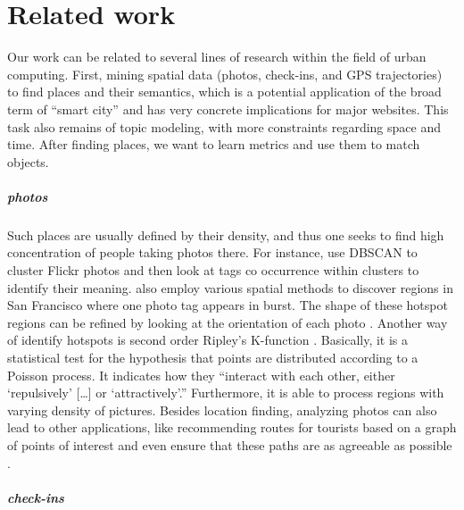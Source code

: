 \chapter{Related work}
\label{chap:related}

Our work can be related to several lines of research within the field of urban
computing. First, mining spatial data (photos, check-ins, and GPS
trajectories) to find places and their semantics, which is a potential
application of the broad term of \enquote{smart city} and has very concrete
implications for major websites. This task also remains of topic modeling,
with more constraints regarding space and time. After finding places, we want
to learn metrics and use them to match objects.

\paragraph{photos}

Such places are usually defined by their density, and thus one seeks to find
high concentration of people taking photos there. For instance,
\textcite{Deng2009} use \textsc{DBSCAN} to cluster Flickr photos and then look
at tags co occurrence within clusters to identify their meaning.
\Textcite{Rattenbury2009} also employ various spatial methods to discover
regions in San Francisco where one photo tag appears in burst. The shape of
these hotspot regions can be refined by looking at the orientation of each
photo \autocite{Hotspots12}. Another way of identify hotspots is second order
Ripley's K-function \autocite{TagHotspot12}. Basically, it is a statistical
test for the hypothesis that points are distributed according to a Poisson
process. It indicates how they \enquote{interact with each other, either
\enquote{repulsively} [\dots] or \enquote{attractively}.} Furthermore, it is
able to process regions with varying density of pictures. Besides location
finding, analyzing photos can also lead to other applications, like
recommending routes for tourists based on a graph of points of interest
\autocite{CityItineraries10} and even ensure that these paths are as agreeable
as possible \autocite{Quercia2014}.

\paragraph{check-ins}

